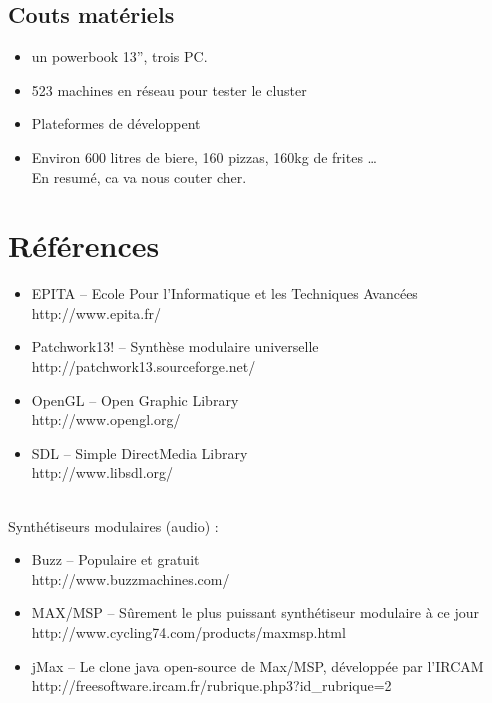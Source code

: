 \documentclass[14pt,a4paper]{article}
\begin{document}
\subsection{Couts mat\'eriels}

\begin{itemize}
\item un powerbook 13'', trois PC.
\item 523 machines en r\'eseau pour tester le cluster
\item Plateformes de d\'eveloppent
\item Environ 600 litres de biere, 160 pizzas, 160kg de frites \ldots\\
 En resum\'e, ca va nous couter cher.
\end{itemize}

\section{R\'ef\'erences}

\begin{itemize}
\item EPITA --  Ecole Pour l'Informatique et les Techniques Avanc\'ees\\
      http://www.epita.fr/
\item Patchwork13! -- Synth\`ese modulaire universelle\\
      http://patchwork13.sourceforge.net/
\item OpenGL -- Open Graphic Library\\
      http://www.opengl.org/
\item SDL -- Simple DirectMedia Library\\
      http://www.libsdl.org/ 
\end{itemize}
\rule{0cm}{5mm}\\
Synth\'etiseurs modulaires (audio) :
\begin{itemize}
\item Buzz -- Populaire et gratuit\\
      http://www.buzzmachines.com/
\item MAX/MSP -- S\^urement le plus puissant synth\'etiseur modulaire \`a ce jour\\
      http://www.cycling74.com/products/maxmsp.html
\item jMax -- Le clone java open-source de Max/MSP, d\'evelopp\'ee par l'IRCAM\\
      http://freesoftware.ircam.fr/rubrique.php3?id\_rubrique=2
\end{itemize}
\end{document}
